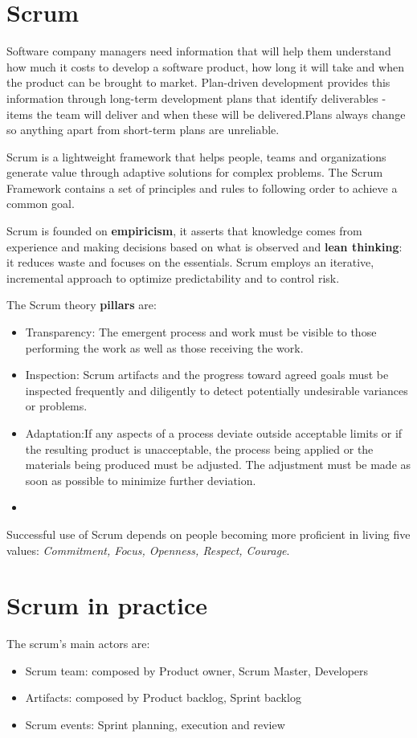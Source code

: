 \documentclass[10pt,a4paper]{report}
\begin{document}
\section{Scrum}
Software company managers need information that will help them understand how much it costs to develop a software product, how long it will take and when the product can be brought to market.
Plan-driven development provides this information through long-term development plans that identify deliverables - items the team will deliver and when these will be delivered.Plans always change so anything apart from short-term plans
are unreliable.


Scrum is a lightweight framework that helps people, teams and organizations generate value through adaptive solutions for
complex problems.
The Scrum Framework contains a set of principles and rules to following order to achieve a common goal.


Scrum is founded on \textbf{empiricism}, it asserts that knowledge comes from experience
and making decisions based on what is observed
and \textbf{lean thinking}: it reduces waste and focuses on the essentials.
Scrum employs an iterative, incremental approach to optimize predictability and to control risk.

The Scrum theory \textbf{pillars} are:
\begin{itemize}
	\item Transparency: The emergent process and work must be visible to those performing
	the work as well as those receiving the work.
	
	\item Inspection: Scrum artifacts and the progress toward agreed goals must be
	inspected frequently and diligently to detect potentially undesirable
	variances or problems.
	
	\item Adaptation:If any aspects of a process deviate outside acceptable limits or if the
	resulting product is unacceptable, the process being applied or the
	materials being produced must be adjusted. The adjustment must be
	made as soon as possible to minimize further deviation.
	
	\item 
\end{itemize}

Successful use of Scrum depends on people becoming
more proficient in living five values: \textit{Commitment, Focus, Openness, Respect, Courage}.

\section{Scrum in practice}
The scrum's main actors are:
\begin{itemize}
	\item Scrum team: composed by Product owner, Scrum Master, Developers
	
	\item Artifacts: composed by Product backlog, Sprint backlog
	
	\item Scrum events: Sprint planning, execution and review
\end{itemize}
\end{document}
